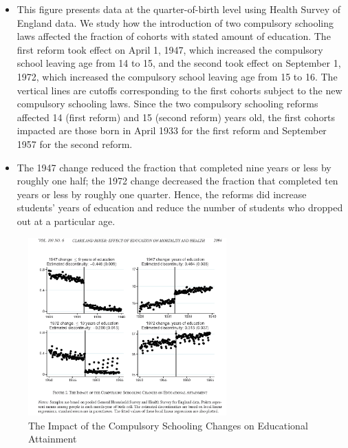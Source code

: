 \begin{itemize}
        \item This figure presents data at the quarter-of-birth level using Health Survey of England data. We study how the introduction of two compulsory schooling laws affected the fraction of cohorts with stated amount of education. The first reform took effect on April 1, 1947, which increased the compulsory school leaving age from 14 to 15, and the second took effect on September 1, 1972, which increased the compulsory school leaving age from 15 to 16. The vertical lines are cutoffs corresponding to the first cohorts subject to the new compulsory schooling laws. Since the two compulsory schooling reforms affected 14 (first reform) and 15 (second reform) years old, the first cohorts impacted are those born in April 1933 for the first reform and September 1957 for the second reform.
                 
        \item The 1947 change reduced the fraction that completed nine years or less by roughly one half; the 1972 change decreased the fraction that completed ten years or less by roughly one quarter. Hence, the reforms did increase students' years of education and reduce the number of students who dropped out at a particular age.
\end{itemize}
       
\begin{figure}[H]%
                \centering
                \includegraphics[width=3in]{images/ch3/36.png}
                \caption{The Impact of the Compulsory Schooling Changes on Educational Attainment}
                \label{fig:label}
            \end{figure}

